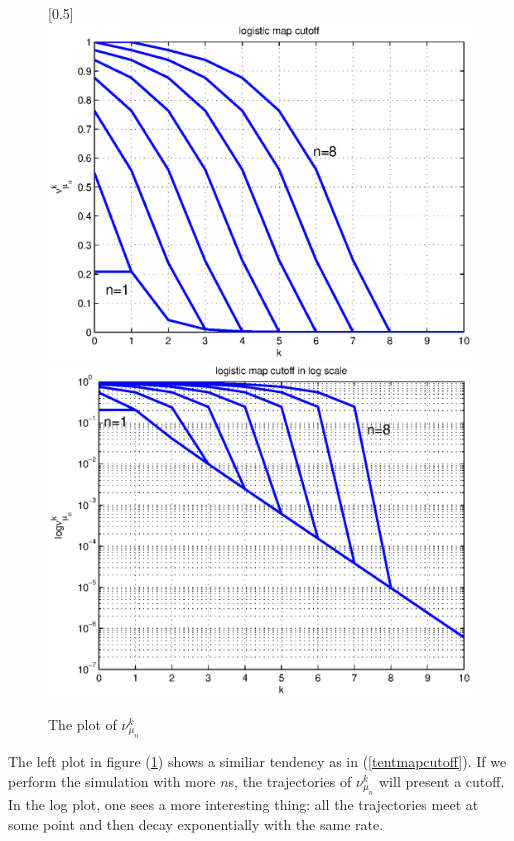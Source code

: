\documentclass{article}
\begin{document}
\begin{figure}
\caption{\label{logisticmapcutoff} The plot of $\nu_{\mu_n}^k$}
\centerline{\scalebox{0.5}[0.5]{\includegraphics{logisticmapcutoff.eps}
                                \includegraphics{logisticmapcutofflog.eps}}}
\end{figure}
The left plot in figure (\ref{logisticmapcutoff}) shows a similiar tendency as in (\ref{tentmapcutoff}). If we perform the simulation with more $n$s, the trajectories of $\nu_{\mu_n}^k$ will present a cutoff. In the log plot, one sees a more interesting thing: all the trajectories meet at some point and then decay exponentially with the same rate. 
\end{document}
